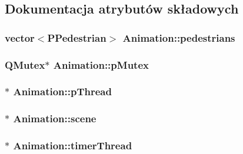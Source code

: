 \subsection{Dokumentacja atrybutów składowych}
\hypertarget{class_animation_a9a50b5633df9820fa015877dd3edf58a}{
\subsubsection[{pedestrians}]{\setlength{\rightskip}{0pt plus 5cm}vector$<${\bf P\-Pedestrian}$>$ Animation\-::pedestrians\hspace{0.3cm}{\ttfamily [private]}}}\label{class_animation_a9a50b5633df9820fa015877dd3edf58a}
\hypertarget{class_animation_a5490d733aa00b66e70b6a565586302fa}{
\subsubsection[{p\-Mutex}]{\setlength{\rightskip}{0pt plus 5cm}Q\-Mutex$\ast$ Animation\-::p\-Mutex\hspace{0.3cm}{\ttfamily [private]}}}\label{class_animation_a5490d733aa00b66e70b6a565586302fa}
\hypertarget{class_animation_ac42fc82f2ed555969f1af462b9383808}{
\subsubsection[{p\-Thread}]{$\ast$ Animation\-::p\-Thread\hspace{0.3cm}{\ttfamily [private]}}}\label{class_animation_ac42fc82f2ed555969f1af462b9383808}
\hypertarget{class_animation_af7faf55dbca323903ba7a89acaad0114}{
\subsubsection[{scene}]{$\ast$ Animation\-::scene\hspace{0.3cm}{\ttfamily [private]}}}\label{class_animation_af7faf55dbca323903ba7a89acaad0114}
\hypertarget{class_animation_adb73aef80dc2314741d49b59654a536c}{
\subsubsection[{timer\-Thread}]{$\ast$ Animation\-::timer\-Thread\hspace{0.3cm}{\ttfamily [private]}}}\label{class_animation_adb73aef80dc2314741d49b59654a536c}
